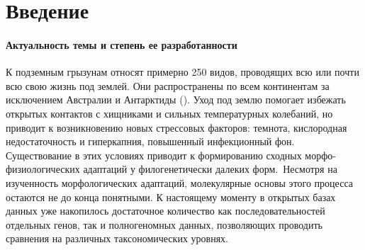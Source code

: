 \chapter*{Введение}							%

\subsubsection*{Актуальность темы и степень ее разработанности}
%
%
%

К подземным грызунам относят примерно 250 видов, проводящих всю или почти всю свою жизнь под землей. Они распространены по всем континентам за исключением Австралии и Антарктиды (\cite{Fang2015}). Уход под землю помогает избежать открытых контактов с хищниками и сильных температурных колебаний, но приводит к возникновению новых стрессовых факторов: темнота, кислородная недостаточность и гиперкапния, повышенный инфекционный фон. Существование в этих условиях приводит к формированию сходных морфо-физиологических адаптаций у филогенетически далеких форм. Несмотря на изученность морфологических адаптаций, молекулярные основы этого процесса остаются не до конца понятными. К настоящему моменту в открытых базах данных уже накопилось достаточное количество как последовательностей отдельных генов, так и полногеномных данных, позволяющих проводить сравнения на различных таксономических уровнях.


